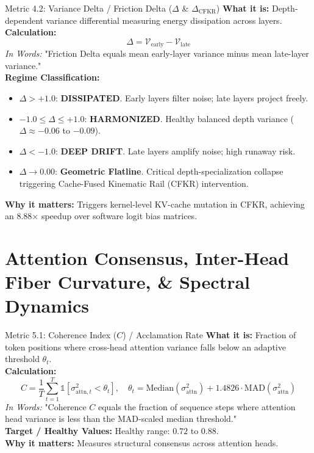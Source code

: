 \documentclass[10pt,a4paper]{article}
\begin{document}
\begin{metricbox}{Metric 4.2: Variance Delta / Friction Delta ($\Delta$ \& $\Delta_{\text{CFKR}}$)}
\textbf{What it is:} Depth-dependent variance differential measuring energy dissipation across layers.\\
\textbf{Calculation:}
$$\Delta = \mathcal{V}_{\text{early}} - \mathcal{V}_{\text{late}}$$
\emph{In Words:} "Friction Delta equals mean early-layer variance minus mean late-layer variance."\\
\textbf{Regime Classification:}
\begin{itemize}
    \item $\Delta > +1.0$: \textbf{DISSIPATED}. Early layers filter noise; late layers project freely.
    \item $-1.0 \le \Delta \le +1.0$: \textbf{HARMONIZED}. Healthy balanced depth variance ($\Delta \approx -0.06$ to $-0.09$).
    \item $\Delta < -1.0$: \textbf{DEEP DRIFT}. Late layers amplify noise; high runaway risk.
    \item $\Delta \to 0.00$: \textbf{Geometric Flatline}. Critical depth-specialization collapse triggering Cache-Fused Kinematic Rail (CFKR) intervention.
\end{itemize}
\textbf{Why it matters:} Triggers kernel-level KV-cache mutation in CFKR, achieving an 8.88$\times$ speedup over software logit bias matrices.
\end{metricbox}

\section{Attention Consensus, Inter-Head Fiber Curvature, \& Spectral Dynamics}

\begin{metricbox}{Metric 5.1: Coherence Index ($C$) / Acclamation Rate}
\textbf{What it is:} Fraction of token positions where cross-head attention variance falls below an adaptive threshold $\theta_t$.\\
\textbf{Calculation:}
$$C = \frac{1}{T} \sum_{t=1}^T \mathbb{1}\left[\sigma_{\text{attn}, t}^2 < \theta_t\right], \quad \theta_t = \text{Median}(\sigma_{\text{attn}}^2) + 1.4826 \cdot \text{MAD}(\sigma_{\text{attn}}^2)$$
\emph{In Words:} "Coherence $C$ equals the fraction of sequence steps where attention head variance is less than the MAD-scaled median threshold."\\
\textbf{Target / Healthy Values:} Healthy range: $0.72$ to $0.88$.\\
\textbf{Why it matters:} Measures structural consensus across attention heads.
\end{metricbox}
\end{document}
